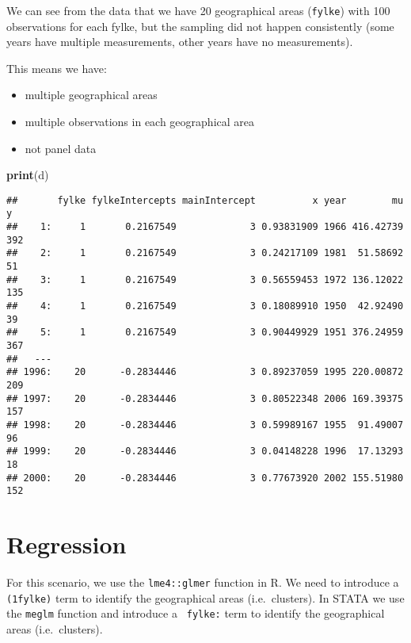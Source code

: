 \documentclass[]{book}
\newenvironment{Shaded}{\begin{snugshade}}{\end{snugshade}}
\newcommand{\KeywordTok}[1]{\textcolor[rgb]{0.13,0.29,0.53}{\textbf{#1}}}
\newcommand{\NormalTok}[1]{#1}
\providecommand{\tightlist}{%
  \setlength{\itemsep}{0pt}\setlength{\parskip}{0pt}}
\begin{document}
We can see from the data that we have 20 geographical areas
(\texttt{fylke}) with 100 observations for each fylke, but the sampling
did not happen consistently (some years have multiple measurements,
other years have no measurements).

This means we have:

\begin{itemize}
\tightlist
\item
  multiple geographical areas
\item
  multiple observations in each geographical area
\item
  not panel data
\end{itemize}

\begin{Shaded}
\begin{Highlighting}[]
\KeywordTok{print}\NormalTok{(d)}
\end{Highlighting}
\end{Shaded}

\begin{verbatim}
##       fylke fylkeIntercepts mainIntercept          x year        mu   y
##    1:     1       0.2167549             3 0.93831909 1966 416.42739 392
##    2:     1       0.2167549             3 0.24217109 1981  51.58692  51
##    3:     1       0.2167549             3 0.56559453 1972 136.12022 135
##    4:     1       0.2167549             3 0.18089910 1950  42.92490  39
##    5:     1       0.2167549             3 0.90449929 1951 376.24959 367
##   ---                                                                  
## 1996:    20      -0.2834446             3 0.89237059 1995 220.00872 209
## 1997:    20      -0.2834446             3 0.80522348 2006 169.39375 157
## 1998:    20      -0.2834446             3 0.59989167 1955  91.49007  96
## 1999:    20      -0.2834446             3 0.04148228 1996  17.13293  18
## 2000:    20      -0.2834446             3 0.77673920 2002 155.51980 152
\end{verbatim}

\newpage

\section{Regression}\label{regression}

For this scenario, we use the \texttt{lme4::glmer} function in R. We
need to introduce a \texttt{(1\textbar{}fylke)} term to identify the
geographical areas (i.e.~clusters). In STATA we use the \texttt{meglm}
function and introduce a \texttt{\textbar{}\textbar{}\ fylke:} term to
identify the geographical areas (i.e.~clusters).
\end{document}
